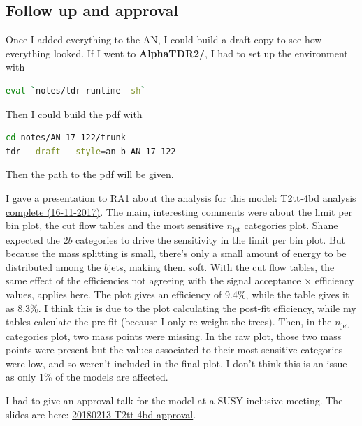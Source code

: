 

\subsection{Follow up and approval}

Once I added everything to the AN, I could build a draft copy to see how everything looked. If I went to \textbf{AlphaTDR2/}, I had to set up the environment with

\begin{lstlisting}[belowskip=-0.7cm, language=sh, numbers=none]
eval `notes/tdr runtime -sh`
\end{lstlisting}

Then I could build the pdf with

\begin{lstlisting}[belowskip=-0.7cm, language=sh, numbers=none]
cd notes/AN-17-122/trunk
tdr --draft --style=an b AN-17-122
\end{lstlisting}

Then the path to the pdf will be given.

I gave a presentation to RA1 about the analysis for this model: \href{run:./sec31/T2tt-4bd analysis complete (16-11-2017).pdf}{T2tt-4bd analysis complete (16-11-2017)}. The main, interesting comments were about the limit per bin plot, the cut flow tables and the most sensitive $n_{\mathrm{jet}}$ categories plot. Shane expected the $2b$ categories to drive the sensitivity in the limit per bin plot. But because the mass splitting is small, there's only a small amount of energy to be distributed among the $b$jets, making them soft. With the cut flow tables, the same effect of the efficiencies not agreeing with the signal acceptance $\times$ efficiency values, applies here. The plot gives an efficiency of 9.4\%, while the table gives it as 8.3\%. I think this is due to the plot calculating the post-fit efficiency, while my tables calculate the pre-fit (because I only re-weight the trees). Then, in the $n_{\mathrm{jet}}$ categories plot, two mass points were missing. In the raw plot, those two mass points were present but the values associated to their most sensitive categories were low, and so weren't included in the final plot. I don't think this is an issue as only 1\% of the models are affected.

I had to give an approval talk for the model at a SUSY inclusive meeting. The slides are here: \href{run:./sec31/T20180213 T2tt-4bd approval.pdf}{20180213 T2tt-4bd approval}.


